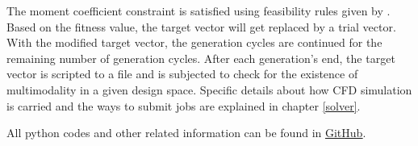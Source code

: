 The moment coefficient constraint is satisfied using feasibility rules given by \cite{Deb}. Based on the fitness value, the target vector will get replaced by a trial vector. With the modified target vector, the generation cycles are continued for the remaining number of generation cycles. After each generation's end, the target vector is scripted to a file and is subjected to check for the existence of multimodality in a given design space. Specific details about how CFD simulation is carried and the ways to submit jobs are explained in chapter \ref{solver}.

All python codes and other related information can be found in \href{https://github.com/neelu065/M-Tech_project_code.git}{\underline{GitHub}}.